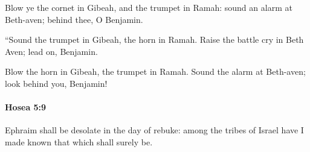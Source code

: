 			\begin{versebox}
					\item[BHS] 
					\item[LXX] 
					\item[ASV] Blow ye the cornet in Gibeah, and the trumpet in Ramah: sound an alarm at Beth-aven; behind thee, O Benjamin.
					\item[NIV] “Sound the trumpet in Gibeah, the horn in Ramah. Raise the battle cry in Beth Aven; lead on, Benjamin.
					\item[NRSV] Blow the horn in Gibeah, the trumpet in Ramah. Sound the alarm at Beth-aven; look behind you, Benjamin!
			\end{versebox}

		\paragraph{Hosea 5:9} %
			\label{HOSEA-5-9}

			Ephraim shall be desolate in the day of rebuke: among the tribes of Israel have I made known that which shall surely be.

